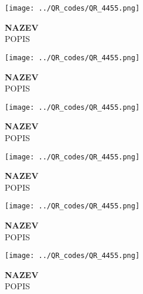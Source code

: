 \documentclass[10pt, a4paper]{article}%
\begin{document}
\begin{minipage}[c][2.9cm][c]{1.5cm}\texttt{[image: ../QR\_codes/QR\_4455.png]}\end{minipage}\begin{minipage}[c][2.9cm][c]{4.7cm}\normalsize\textbf{NAZEV}\\\small POPIS\end{minipage}\hspace{0.1cm}
\begin{minipage}[c][2.9cm][c]{1.5cm}\texttt{[image: ../QR\_codes/QR\_4455.png]}\end{minipage}\begin{minipage}[c][2.9cm][c]{4.7cm}\normalsize\textbf{NAZEV}\\\small POPIS\end{minipage}\hspace{0.1cm}
\begin{minipage}[c][2.9cm][c]{1.5cm}\texttt{[image: ../QR\_codes/QR\_4455.png]}\end{minipage}\begin{minipage}[c][2.9cm][c]{4.7cm}\normalsize\textbf{NAZEV}\\\small POPIS\end{minipage}\hspace{0.1cm}
\begin{minipage}[c][2.9cm][c]{1.5cm}\texttt{[image: ../QR\_codes/QR\_4455.png]}\end{minipage}\begin{minipage}[c][2.9cm][c]{4.7cm}\normalsize\textbf{NAZEV}\\\small POPIS\end{minipage}\hspace{0.1cm}
\begin{minipage}[c][2.9cm][c]{1.5cm}\texttt{[image: ../QR\_codes/QR\_4455.png]}\end{minipage}\begin{minipage}[c][2.9cm][c]{4.7cm}\normalsize\textbf{NAZEV}\\\small POPIS\end{minipage}\hspace{0.1cm}
\begin{minipage}[c][2.9cm][c]{1.5cm}\texttt{[image: ../QR\_codes/QR\_4455.png]}\end{minipage}\begin{minipage}[c][2.9cm][c]{4.7cm}\normalsize\textbf{NAZEV}\\\small POPIS\end{minipage}\hspace{0.1cm}
\end{document}
